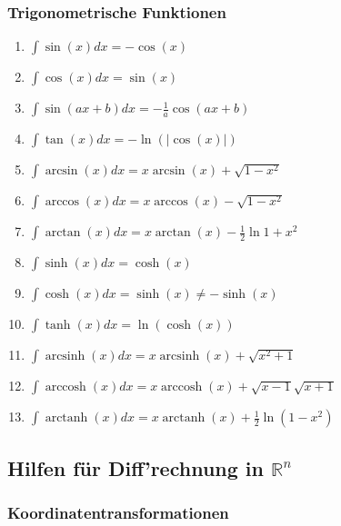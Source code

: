 \documentclass[a4paper, 9pt, DIV=24]{scrartcl}
\DeclareMathOperator{\arcsinh}{arcsinh}
\DeclareMathOperator{\arccosh}{arccosh}
\DeclareMathOperator{\arctanh}{arctanh}
\begin{document}
\subsubsection{Trigonometrische Funktionen}
\begin{enumerate}[label={(}\arabic*{)}]
 \item $\int \sin(x) dx = -\cos(x)$
 \item $\int \cos(x) dx = \sin(x)$
 \item $\int \sin(ax+b) dx = -\frac{1}{a}\cos(ax+b)$
 \item $\int \tan(x) dx = -\ln(|\cos(x)|)$
 \item $\int \arcsin(x) dx = x\arcsin(x) + \sqrt{1-x^2}$
 \item $\int \arccos(x) dx = x\arccos(x) - \sqrt{1-x^2}$
 \item $\int \arctan(x) dx = x\arctan(x) - \frac{1}{2}\ln{1+x^2}$
 \item $\int \sinh(x) dx = \cosh(x)$
 \item $\int \cosh(x) dx = \sinh(x) \neq -\sinh(x)$
 \item $\int \tanh(x) dx = \ln(\cosh(x))$
 \item $\int \arcsinh(x) dx = x\arcsinh(x) + \sqrt{x^2+1}$
 \item $\int \arccosh(x) dx = x\arccosh(x) + \sqrt{x-1}\sqrt{x+1}$
 \item $\int \arctanh(x) dx = x\arctanh(x) + \frac{1}{2}\ln(1-x^2)$
\end{enumerate}

\clearpage
\subsection{Hilfen für Diff'rechnung in $\mathbb{R}^n$}
\subsubsection{Koordinatentransformationen}
\end{document}
